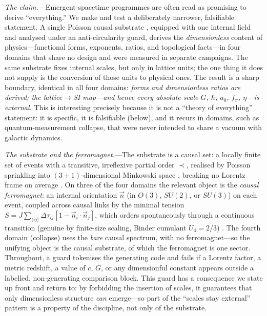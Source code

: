 \documentclass[aps,prl,reprint,nofootinbib,superscriptaddress,floatfix]{revtex4-2}
\begin{document}
\emph{The claim.}---Emergent-spacetime programmes are often read as promising to derive
``everything.'' We make and test a deliberately narrower, falsifiable statement. A single
Poisson causal substrate \cite{BLMS1987,BombelliHensonSorkin2009,Surya2019}, equipped
with one internal field and analysed under an anti-circularity guard, derives the
\emph{dimensionless} content of physics---functional forms, exponents, ratios, and
topological facts---in four domains that share no design and were measured in separate
campaigns. The same substrate fixes internal scales, but only in lattice units; the one
thing it does not supply is the conversion of those units to physical ones. The result is
a sharp boundary, identical in all four domains: \emph{forms and dimensionless ratios are
derived; the lattice$\to$SI map---and hence every absolute scale $G$, $\hbar$, $a_0$,
$f_\pi$, $\eta$---is external.} This is interesting precisely because it is not a ``theory
of everything'' statement: it is specific, it is falsifiable (below), and it recurs in
domains, such as quantum-measurement collapse, that were never intended to share a vacuum
with galactic dynamics.

\emph{The substrate and the ferromagnet.}---The substrate is a causal set: a locally
finite set of events with a transitive, irreflexive partial order $\prec$, realised by
Poisson sprinkling into $(3{+}1)$-dimensional Minkowski space \cite{BLMS1987}, breaking no
Lorentz frame on average \cite{BombelliHensonSorkin2009}. On three of the four domains the
relevant object is the \emph{causal ferromagnet}: an internal orientation $\vec n$ (in
$O(3)$, $SU(2)$, or $SU(3)$) on each event, coupled across causal links by the minimal
tension $S=J\sum_{\langle ij\rangle}\Delta\tau_{ij}[1-\vec n_i\!\cdot\!\vec n_j]$, which
orders spontaneously through a continuous transition (genuine by finite-size scaling,
Binder cumulant $U_4=2/3$) \cite{GoldstonePRD}. The fourth domain (collapse) uses the
\emph{bare} causal spectrum, with no ferromagnet---so the unifying object is the causal
substrate, of which the ferromagnet is one sector. Throughout, a guard tokenises the
generating code and fails if a Lorentz factor, a metric redshift, a value of $c$, $G$, or
any dimensionful constant appears outside a labelled, non-generating comparison block.
This guard has a consequence we state up front and return to: by forbidding the insertion
of scales, it guarantees that only dimensionless structure \emph{can} emerge---so part of
the ``scales stay external'' pattern is a property of the discipline, not only of the
substrate.
\end{document}
